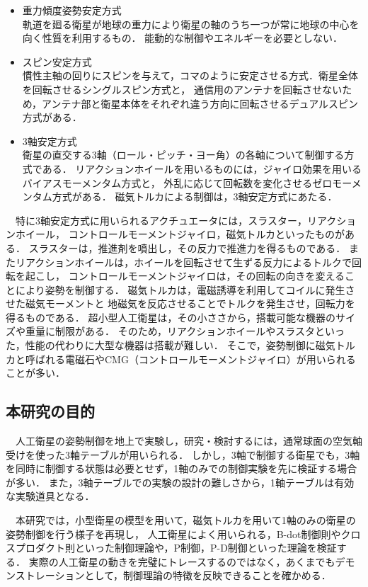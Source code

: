 \begin{itemize}
    \item 重力傾度姿勢安定方式\\
    軌道を廻る衛星が地球の重力により衛星の軸のうち一つが常に地球の中心を向く性質を利用するもの．
    能動的な制御やエネルギーを必要としない．
    \item スピン安定方式\\
    慣性主軸の回りにスピンを与えて，コマのように安定させる方式．衛星全体を回転させるシングルスピン方式と，
    通信用のアンテナを回転させないため，アンテナ部と衛星本体をそれぞれ違う方向に回転させるデュアルスピン方式がある．
    \item 3軸安定方式\\
    衛星の直交する3軸（ロール・ピッチ・ヨー角）の各軸について制御する方式である．
    リアクションホイールを用いるものには，ジャイロ効果を用いるバイアスモーメンタム方式と，
    外乱に応じて回転数を変化させるゼロモーメンタム方式がある．
    磁気トルカによる制御は，3軸安定方式にあたる．
\end{itemize}

　特に3軸安定方式に用いられるアクチュエータには，スラスター，リアクションホイール，
コントロールモーメントジャイロ，磁気トルカといったものがある．
スラスターは，推進剤を噴出し，その反力で推進力を得るものである．
またリアクションホイールは，ホイールを回転させて生ずる反力によるトルクで回転を起こし，
コントロールモーメントジャイロは，その回転の向きを変えることにより姿勢を制御する．
磁気トルカは，電磁誘導を利用してコイルに発生させた磁気モーメントと
地磁気を反応させることでトルクを発生させ，回転力を得るものである．
超小型人工衛星は，その小ささから，搭載可能な機器のサイズや重量に制限がある．
そのため，リアクションホイールやスラスタといった，性能の代わりに大型な機器は搭載が難しい．
そこで，姿勢制御に磁気トルカと呼ばれる電磁石やCMG（コントロールモーメントジャイロ）が用いられることが多い．



\subsection{本研究の目的}
　人工衛星の姿勢制御を地上で実験し，研究・検討するには，通常球面の空気軸受けを使った3軸テーブルが用いられる．
しかし，3軸で制御する衛星でも，3軸を同時に制御する状態は必要とせず，1軸のみでの制御実験を先に検証する場合が多い．
また，3軸テーブルでの実験の設計の難しさから，1軸テーブルは有効な実験道具となる．

　本研究では，小型衛星の模型を用いて，磁気トルカを用いて1軸のみの衛星の姿勢制御を行う様子を再現し，
人工衛星によく用いられる，B-dot制御則やクロスプロダクト則といった制御理論や，P制御，P-D制御といった理論を検証する．
実際の人工衛星の動きを完璧にトレースするのではなく，あくまでもデモンストレーションとして，制御理論の特徴を反映できることを確かめる．
